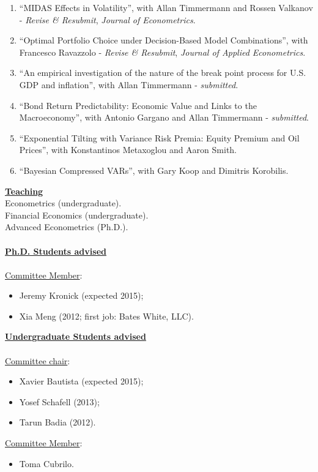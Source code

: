 \documentclass[12pt]{article}
\begin{document}
\begin{enumerate}
	\setcounter{enumi}{\theenumTemp}
	\item ``MIDAS Effects in Volatility'', with Allan Timmermann and Rossen Valkanov - \textit{Revise \& Resubmit}, \emph{Journal of Econometrics}.
	\item ``Optimal Portfolio Choice under Decision-Based Model Combinations'', with Francesco Ravazzolo - \textit{Revise \& Resubmit}, \emph{Journal of Applied Econometrics}.
	\item ``An empirical investigation of the nature of the break point process for U.S. GDP and inflation'', with Allan Timmermann  - \textit{submitted}.
	\item ``Bond Return Predictability: Economic Value and Links to the Macroeconomy'', with Antonio Gargano and Allan Timmermann - \textit{submitted}.
	\item ``Exponential Tilting with Variance Risk Premia: Equity Premium and Oil Prices'', with Konstantinos Metaxoglou  and Aaron Smith.
	\item ``Bayesian Compressed VARs'', with Gary Koop and Dimitris Korobilis.
	
\end{enumerate}

\underline{\textbf{Teaching}}\\
Econometrics (undergraduate).\\
Financial Economics (undergraduate). \\
Advanced Econometrics (Ph.D.). \\ \\
\underline{\textbf{Ph.D. Students advised}} \\ \\
\underline{Committee Member}: 
\begin{itemize}
	\item Jeremy Kronick (expected 2015);
	\item Xia Meng (2012; first job: Bates White, LLC). 
\end{itemize}
\underline{\textbf{Undergraduate Students advised}} \\ \\
\underline{Committee chair}: 
\begin{itemize}
	\item Xavier Bautista (expected 2015);
	\item Yosef Schafell (2013);
	\item Tarun Badia (2012). 
\end{itemize}
\underline{Committee Member}: 
\begin{itemize}
	\item Toma Cubrilo.
\end{itemize}
\end{document}

